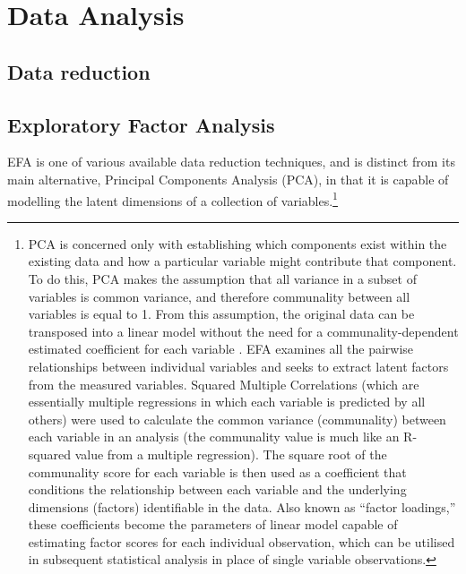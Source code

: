 \section{Data Analysis\label{app8:dataAnalysis}}




\subsection{Data reduction\label{app8:dataReduction}}


\subsection{Exploratory Factor Analysis\label{app8:EFA}}
EFA is one of various available data reduction techniques, and is distinct from its main alternative, Principal Components Analysis (PCA), in that it is capable of modelling the latent dimensions of a collection of variables.\footnote{PCA is concerned only with establishing which components exist within the existing data and how a particular variable might contribute that component. To do this, PCA makes the assumption that all variance in a subset of variables is common variance, and therefore communality between all variables is equal to 1. From this assumption, the original data can be transposed into a linear model without the need for a communality-dependent estimated coefficient for each variable \citep{Widaman2007}. EFA examines all the pairwise relationships between individual variables and seeks to extract latent factors from the measured variables.  Squared Multiple Correlations (which are essentially multiple regressions in which each variable is predicted by all others) were used to calculate the common variance (communality) between each variable in an analysis (the communality value is much like an R-squared value from a multiple regression).
The square root of the communality score for each variable is then used as a coefficient that conditions the relationship between each variable and the underlying dimensions (factors) identifiable in the data. Also known as ``factor loadings,'' these coefficients become the parameters of linear model capable of estimating factor scores for each individual observation, which can be utilised in subsequent statistical analysis in place of single variable observations.

}
